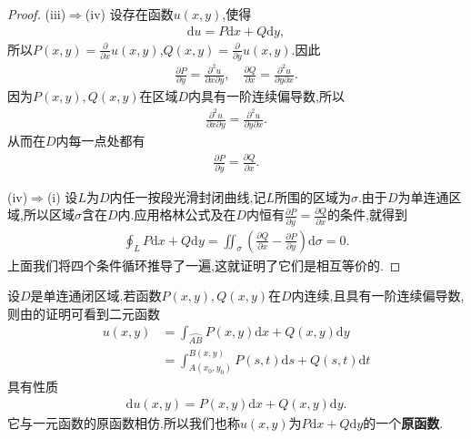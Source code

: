 \documentclass[../../main.tex]{subfiles}%
\begin{document}
\begin{proof}
(iii)$\Rightarrow$(iv) 设存在函数$u(x,y)$,使得
\begin{align*}
\mathrm{d}u = P\mathrm{d}x + Q\mathrm{d}y,
\end{align*}
所以$P(x,y) = \frac{\partial}{\partial x} u(x,y)$,$Q(x,y) = \frac{\partial}{\partial y} u(x,y)$.因此
\begin{align*}
\frac{\partial P}{\partial y} = \frac{\partial^2 u}{\partial x \partial y},\quad \frac{\partial Q}{\partial x} = \frac{\partial^2 u}{\partial y \partial x}.
\end{align*}
因为$P(x,y),Q(x,y)$在区域$D$内具有一阶连续偏导数,所以
\begin{align*}
\frac{\partial^2 u}{\partial x \partial y} = \frac{\partial^2 u}{\partial y \partial x}.
\end{align*}
从而在$D$内每一点处都有
\begin{align*}
\frac{\partial P}{\partial y} = \frac{\partial Q}{\partial x}.
\end{align*}

(iv)$\Rightarrow$(i) 设$L$为$D$内任一按段光滑封闭曲线,记$L$所围的区域为$\sigma$.由于$D$为单连通区域,所以区域$\sigma$含在$D$内.应用格林公式及在$D$内恒有$\frac{\partial P}{\partial y} = \frac{\partial Q}{\partial x}$的条件,就得到
\begin{align*}
\oint_L P\mathrm{d}x + Q\mathrm{d}y = \iint_{\sigma} \left( \frac{\partial Q}{\partial x} - \frac{\partial P}{\partial y} \right) \mathrm{d}\sigma = 0.
\end{align*}
上面我们将四个条件循环推导了一遍,这就证明了它们是相互等价的.

\end{proof}

\begin{definition}
设$D$是单连通闭区域.若函数$P(x,y),Q(x,y)$在$D$内连续,且具有一阶连续偏导数,则由的证明可看到二元函数
\begin{align*}
u(x,y) &= \int_{\wideparen{AB}} P(x,y)\mathrm{d}x + Q(x,y)\mathrm{d}y \\
&= \int_{A(x_0,y_0)}^{B(x,y)} P(s,t)\mathrm{d}s + Q(s,t)\mathrm{d}t
\end{align*}
具有性质
\begin{align*}
\mathrm{d}u(x,y) = P(x,y)\mathrm{d}x + Q(x,y)\mathrm{d}y.
\end{align*}
它与一元函数的原函数相仿.所以我们也称$u(x,y)$为$P\mathrm{d}x+Q\mathrm{d}y$的一个\textbf{原函数}.
\end{definition}
\end{document}
